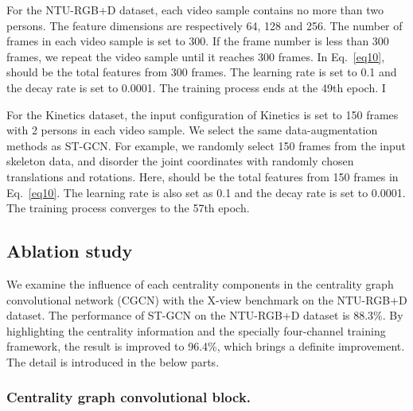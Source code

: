 \documentclass[runningheads]{llncs}
\begin{document}
For the NTU-RGB+D dataset, each video sample contains no more than two persons. The feature dimensions are respectively 64, 128 and 256. The number of frames in each video sample is set to 300. If the frame number is less than 300 frames, we repeat the video sample until it reaches 300 frames. In Eq.~\ref{eq10},  should be the total features from 300 frames. The learning rate is set to 0.1 and the decay rate is set to 0.0001. The training process ends at the 49th epoch. I

For the Kinetics dataset, the input configuration of Kinetics is set to 150 frames with 2 persons in each video sample. We select the same data-augmentation methods as ST-GCN. For example, we randomly select 150 frames from the input skeleton data, and disorder the joint coordinates with randomly chosen translations and rotations. Here,  should be the total features from 150 frames in Eq.~\ref{eq10}. The learning rate is also set as 0.1 and the decay rate is set to 0.0001. The training process converges to the 57th epoch. 

\subsection{Ablation study}

We examine the influence of each centrality components in the centrality graph convolutional network (CGCN) with the X-view benchmark on the NTU-RGB+D dataset. The performance of ST-GCN on the NTU-RGB+D dataset is 88.3\%. By highlighting the centrality information and the specially four-channel training framework, the result is improved to 96.4\%, which brings a definite improvement. The detail is introduced in the below parts.

\subsubsection{Centrality graph convolutional block.}
\end{document}
